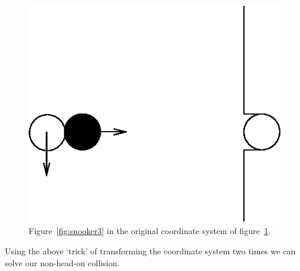 \documentclass[12pt,a4paper]{article}
\numberwithin{equation}{section}
\numberwithin{figure}{section}
\numberwithin{table}{section}
\begin{document}
\begin{figure}\begin{center}
\includegraphics{snooker4.eps}%
\caption{Figure~\ref{fig:snooker3} in the original coordinate system of figure~\ref{fig:snooker4}.}\label{fig:snooker4}
\end{center}\end{figure}

Using the above `trick' of transforming the coordinate system two times we can solve our non-head-on collision.
\end{document}
